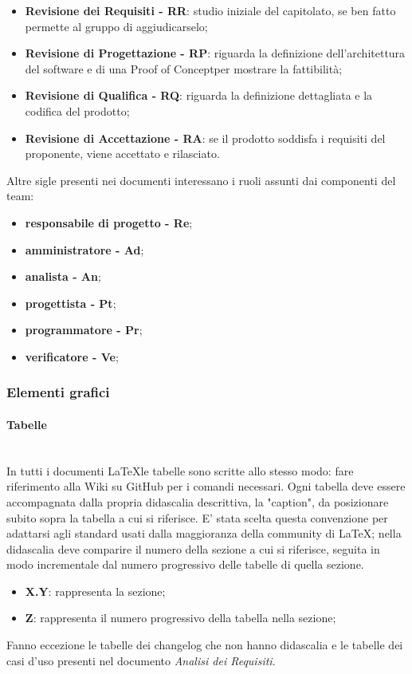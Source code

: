 		\begin{itemize}
			\item \textbf{Revisione dei Requisiti - RR}: studio iniziale del capitolato, se ben fatto permette al gruppo di aggiudicarselo;
			\item \textbf{Revisione di Progettazione - RP}: riguarda la definizione dell'architettura del software e di una Proof of Concept\glosp per mostrare la fattibilità;
			\item \textbf{Revisione di Qualifica - RQ}: riguarda la definizione dettagliata e la codifica del prodotto;
			\item \textbf{Revisione di Accettazione - RA}: se il prodotto soddisfa i requisiti del proponente, viene accettato e rilasciato.		
		\end{itemize}	
		Altre sigle presenti nei documenti interessano i ruoli assunti dai componenti del team:
		\begin{itemize}
			\item \textbf{responsabile di progetto - Re};
			\item \textbf{amministratore - Ad};
			\item \textbf{analista - An};
			\item \textbf{progettista - Pt};
			\item \textbf{programmatore - Pr};
			\item \textbf{verificatore - Ve};
		\end{itemize}
		\subsubsection{Elementi grafici}
		\paragraph{Tabelle} \mbox{}\\
		In tutti i documenti \LaTeX le tabelle sono scritte allo stesso modo: fare riferimento alla Wiki su GitHub per i comandi necessari.\newline 
		Ogni tabella deve essere accompagnata dalla propria didascalia descrittiva, la "caption", da posizionare subito sopra la tabella a cui si riferisce. E' stata scelta questa convenzione per adattarsi agli standard usati dalla maggioranza della community di \LaTeX; nella didascalia deve comparire il numero della sezione a cui si riferisce, seguita in modo incrementale dal numero progressivo delle tabelle di quella sezione.
		\begin{itemize}
			\item \textbf{{X.Y}}: rappresenta la sezione;
			\item \textbf{{Z}}: rappresenta il numero progressivo della tabella nella sezione;
		\end{itemize}
		Fanno eccezione le tabelle dei changelog che non hanno didascalia e le tabelle dei casi d’uso presenti nel documento \textit{Analisi dei Requisiti}.

